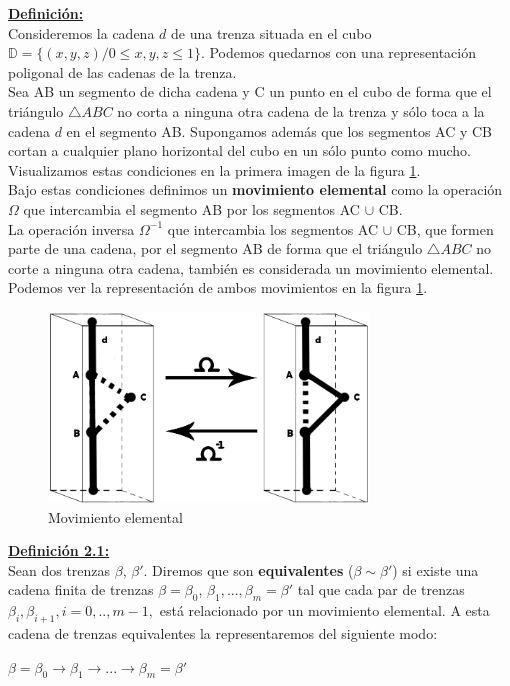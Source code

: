 \textbf{\underline{Definición:}}\\
Consideremos la cadena $d$ de una trenza situada en el cubo $\mathds{D} = \{(x,y,z) / 0 \leq x,y,z \leq 1\}$. Podemos quedarnos con una representación poligonal de las cadenas de la trenza. \\
Sea AB un segmento de dicha cadena y C un punto en el cubo de forma que el triángulo $\triangle ABC$ no corta a ninguna otra cadena de la trenza y sólo toca a la cadena $d$ en el segmento AB. Supongamos además que los segmentos AC y CB cortan a cualquier plano horizontal del cubo en un sólo punto como mucho. Visualizamos estas condiciones en la primera imagen de la figura \ref{elem}.\\
Bajo estas condiciones definimos un \textbf{movimiento elemental} como la operación $ \Omega $ que intercambia el segmento AB por los segmentos AC $ \cup $ CB.\\

La operación inversa $ \Omega^{-1} $ que intercambia los segmentos AC $\cup$  CB, que formen parte de una cadena, por el segmento AB de forma que el triángulo $\triangle ABC$ no corte a ninguna otra cadena, también es considerada un movimiento elemental. \\
Podemos ver la representación de ambos movimientos en la figura \ref{elem}.\\
\begin{figure}[h!]
	\centering
	\includegraphics[width=8.5cm]{itrenzas/elemental.png}
	\caption{Movimiento elemental}
	\label{elem} 
\end{figure}


\textbf{\underline{Definición 2.1:}}\label{defequi}\\
Sean dos trenzas $\beta$, $\beta'$. Diremos que son \textbf{equivalentes} ($\beta \sim \beta'$) si existe una cadena finita de trenzas $ \beta = \beta_{0}$, $\beta_{1},...,\beta_{m}=\beta'$ tal que cada par de trenzas $ \beta_{i}, \beta_{i+1}, i=0,..,m-1, $ está relacionado por un movimiento elemental. A esta cadena de trenzas equivalentes la representaremos del siguiente modo:
\begin{center}
	$ \beta = \beta_{0} \rightarrow \beta_{1} \rightarrow ... \rightarrow \beta_{m}=\beta'$
\end{center}


